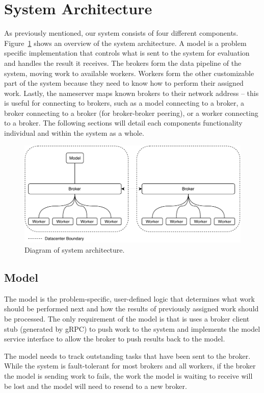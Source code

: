 \documentclass[conference]{IEEEtran}
\begin{document}
\section{System Architecture}
As previously mentioned, our system consists of four different components.
Figure~\ref{fig:sys-arch} shows an overview of the system architecture.
A model
is a problem specific implementation that controls what is sent to the system for
evaluation and handles the result it receives. The brokers form the data pipeline
of the system, moving work to available workers. Workers form the other customizable
part of the system because they need to know how to perform their assigned work.
Lastly, the nameserver maps known brokers to their network address -- this is useful
for connecting to brokers, such as a model connecting to a broker, a broker connecting
to a broker (for broker-broker peering), or a worker connecting to a broker. The
following sections will detail each components functionality individual and within
the system as a whole.

\begin{figure}
  \centering
  \includegraphics{img/broker-arch.pdf}
  \caption{Diagram of system architecture.}
  \label{fig:sys-arch}
\end{figure}

\subsection{Model}
The model is the problem-specific, user-defined logic that determines what work
should be performed next and how the results of previously assigned work should
be processed. The only requirement of the model is that is uses a broker client
stub (generated by gRPC) to push work to the system and implements the model
service interface to allow the broker to push results back to the model.

The model needs to track outstanding tasks that have been sent to the broker.
While the system is fault-tolerant for most brokers and all workers, if the
broker the model is sending work to fails, the work the model is waiting to
receive will be lost and the model will need to resend to a new broker.
\end{document}
